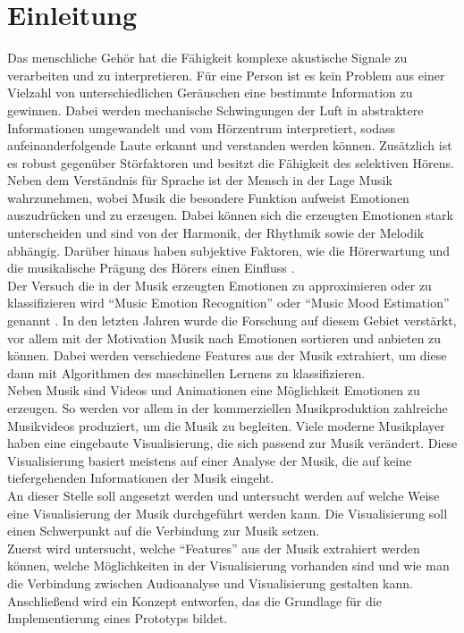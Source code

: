 \documentclass[11pt,a4paper]{article}
\begin{document}
\section{Einleitung}
Das menschliche Gehör hat die Fähigkeit komplexe akustische Signale zu verarbeiten und zu interpretieren. Für eine Person ist es kein Problem aus einer Vielzahl von unterschiedlichen Geräuschen eine bestimmte Information zu gewinnen. Dabei werden mechanische Schwingungen der Luft in abstraktere Informationen umgewandelt und vom Hörzentrum interpretiert, sodass aufeinanderfolgende Laute erkannt und verstanden werden können. Zusätzlich ist es robust gegenüber Störfaktoren und besitzt die Fähigkeit des selektiven Hörens\cite{hawley2004benefit}.\\
Neben dem Verständnis für Sprache ist der Mensch in der Lage Musik wahrzunehmen, wobei Musik die besondere Funktion aufweist Emotionen auszudrücken und zu erzeugen. Dabei können sich die erzeugten Emotionen stark unterscheiden und sind von der Harmonik, der Rhythmik sowie der Melodik abhängig. Darüber hinaus haben subjektive Faktoren, wie die Hörerwartung und die musikalische Prägung des Hörers einen Einfluss \cite[S. 2]{8a02f9c512933d46fbea928d23ac65e38b61b88caba9b38319a5d4952b5a6667}.\\
Der Versuch die in der Musik erzeugten Emotionen zu approximieren oder zu klassifizieren wird ``Music Emotion Recognition'' oder ``Music Mood Estimation'' genannt \cite[S. 158]{lerch2012introduction}. In den letzten Jahren wurde die Forschung auf diesem Gebiet verstärkt, vor allem mit der Motivation Musik nach Emotionen sortieren und anbieten zu können. Dabei werden verschiedene Features aus der Musik extrahiert, um diese dann mit Algorithmen des maschinellen Lernens zu klassifizieren.\\
Neben Musik sind Videos und Animationen eine Möglichkeit Emotionen zu erzeugen. So werden vor allem in der kommerziellen Musikproduktion zahlreiche Musikvideos produziert, um die Musik zu begleiten. Viele moderne Musikplayer haben eine eingebaute Visualisierung, die sich passend zur Musik verändert. Diese Visualisierung basiert meistens auf einer Analyse der Musik, die auf keine tiefergehenden Informationen der Musik eingeht.\\
An dieser Stelle soll angesetzt werden und untersucht werden auf welche Weise eine Visualisierung der Musik durchgeführt werden kann. Die Visualisierung soll einen Schwerpunkt auf die Verbindung zur Musik setzen.\\
Zuerst wird untersucht, welche ``Features'' aus der Musik extrahiert werden können, welche Möglichkeiten in der Visualisierung vorhanden sind und wie man die Verbindung zwischen Audioanalyse und Visualisierung gestalten kann. Anschließend wird ein Konzept entworfen, das die Grundlage für die Implementierung eines Prototyps bildet.
\end{document}
